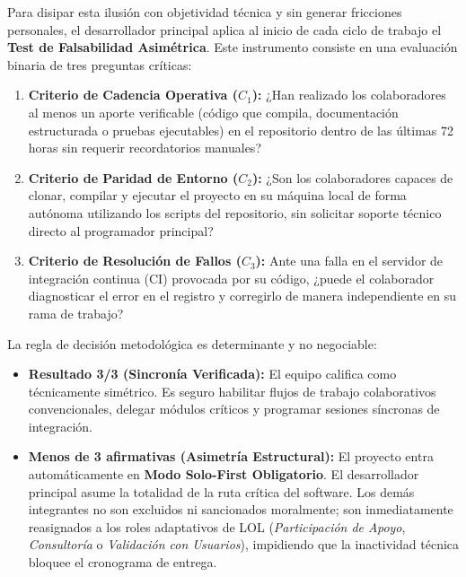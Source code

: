 \documentclass[14pt,a4paper,oneside]{extbook}
\begin{document}
Para disipar esta ilusión con objetividad técnica y sin generar fricciones personales, el desarrollador principal aplica al inicio de cada ciclo de trabajo el \textbf{Test de Falsabilidad Asimétrica}. Este instrumento consiste en una evaluación binaria de tres preguntas críticas:

\begin{tcolorbox}[colback=primary!5, colframe=primary!30, arc=5pt, title=Test de Falsabilidad Asimétrica (Evaluación Tripartita)]
\begin{enumerate}
    \item \textbf{Criterio de Cadencia Operativa ($C_1$):} ¿Han realizado los colaboradores al menos un aporte verificable (código que compila, documentación estructurada o pruebas ejecutables) en el repositorio dentro de las últimas 72 horas sin requerir recordatorios manuales?
    \item \textbf{Criterio de Paridad de Entorno ($C_2$):} ¿Son los colaboradores capaces de clonar, compilar y ejecutar el proyecto en su máquina local de forma autónoma utilizando los scripts del repositorio, sin solicitar soporte técnico directo al programador principal?
    \item \textbf{Criterio de Resolución de Fallos ($C_3$):} Ante una falla en el servidor de integración continua (CI) provocada por su código, ¿puede el colaborador diagnosticar el error en el registro y corregirlo de manera independiente en su rama de trabajo?
\end{enumerate}
\end{tcolorbox}

La regla de decisión metodológica es determinante y no negociable:

\begin{itemize}
    \item \textbf{Resultado 3/3 (Sincronía Verificada):} El equipo califica como técnicamente simétrico. Es seguro habilitar flujos de trabajo colaborativos convencionales, delegar módulos críticos y programar sesiones síncronas de integración.
    \item \textbf{Menos de 3 afirmativas (Asimetría Estructural):} El proyecto entra automáticamente en \textbf{Modo Solo-First Obligatorio}. El desarrollador principal asume la totalidad de la ruta crítica del software. Los demás integrantes no son excluidos ni sancionados moralmente; son inmediatamente reasignados a los roles adaptativos de LOL (\textit{Participación de Apoyo}, \textit{Consultoría} o \textit{Validación con Usuarios}), impidiendo que la inactividad técnica bloquee el cronograma de entrega.
\end{itemize}
\end{document}
